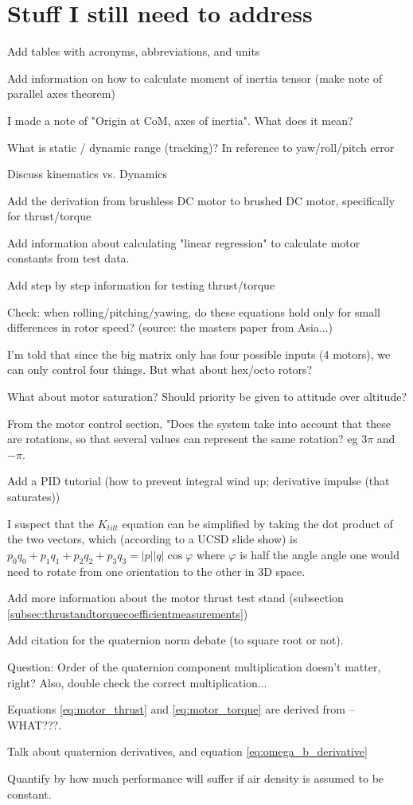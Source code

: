 \documentclass{article}
\numberwithin{equation}{section} %
\begin{document}
\section{Stuff I still need to address}
\begin{list}{*}{}
	\item Add tables with acronyms, abbreviations, and units
	\item Add information on how to calculate moment of inertia tensor (make note of parallel axes theorem)
	\item I made a note of "Origin at CoM, axes of inertia". What does it mean?
	\item What is static / dynamic range (tracking)? In reference to yaw/roll/pitch error
	\item Discuss kinematics vs. Dynamics
	\item Add the derivation from brushless DC motor to brushed DC motor, specifically for thrust/torque
	\item Add information about calculating "linear regression" to calculate motor constants from test data.
	\item Add step by step information for testing thrust/torque
	\item Check: when rolling/pitching/yawing, do these equations hold only for small differences in rotor speed? (source: the masters paper from Asia...)
	\item I'm told that since the big matrix only has four possible inputs (4 motors), we can only control four things. But what about hex/octo rotors?
	\item What about motor saturation? Should priority be given to attitude over altitude?
	\item From the motor control section, "Does the system take into account that these are rotations, so that several values can represent the same rotation? eg $3\pi$ and $-\pi$.
	\item Add a PID tutorial (how to prevent integral wind up; derivative impulse (that saturates))
	\item I suspect that the $K_{tilt}$ equation can be simplified by taking the dot product of the two vectors, which (according to a UCSD slide show) is $p_0 q_0 +p_1 q_1 + p_2 q_2 + p_3 q_3 = |p||q| \cos \varphi$ where $\varphi$ is half the angle angle one would need to rotate from one orientation to the other in 3D space.
	\item Add more information about the motor thrust test stand (subsection \ref{subsec:thrustandtorquecoefficientmeasurements})
	\item Add citation for the quaternion norm debate (to square root or not).
	\item Question: Order of the quaternion component multiplication doesn't matter, right? Also, double check the correct multiplication...
	\item Equations \eqref{eq:motor_thrust} and \eqref{eq:motor_torque} are derived from --WHAT???.
	\item Talk about quaternion derivatives, and equation \eqref{eq:omega_b_derivative}
	\item Quantify by how much performance will suffer if air density is assumed to be constant.
\end{list}
\end{document}
